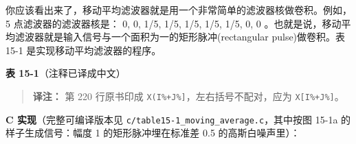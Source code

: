 你应该看出来了，移动平均滤波器就是用一个非常简单的滤波器核做卷积。例如，5
点滤波器的滤波器核是： 0, 0, 1/5, 1/5, 1/5, 1/5, 1/5, 0, 0
。也就是说，移动平均滤波器就是输入信号与一个面积为一的矩形脉冲(rectangular
pulse)做卷积。表 15-1 是实现移动平均滤波器的程序。

\textbf{表 15-1}（注释已译成中文）

\begin{Shaded}
\begin{Highlighting}[]
\NormalTok{130 \textquotesingle{}}
\NormalTok{160 \textquotesingle{}}
\NormalTok{180 \textquotesingle{}}
\NormalTok{220 Y[I\%] = Y[I\%] + X(I\%+J\%]}
\NormalTok{260 \textquotesingle{}}
\end{Highlighting}
\end{Shaded}

\begin{quote}
\textbf{译注：} 第 220 行原书印成
\texttt{X(I\%+J\%{]}}，左右括号不配对，应为 \texttt{X{[}I\%+J\%{]}}。
\end{quote}

\textbf{C 实现}（完整可编译版本见
\texttt{c/table15-1\_moving\_average.c}，其中按图 15-1a
的样子生成信号：幅度 1 的矩形脉冲埋在标准差 0.5 的高斯白噪声里）：


